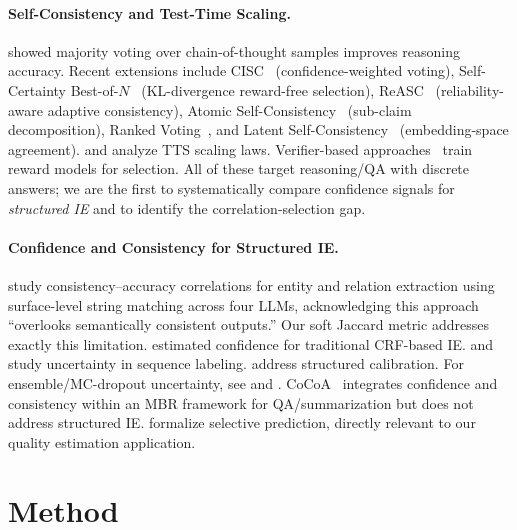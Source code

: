 \documentclass[11pt,a4paper]{article}
\begin{document}
\paragraph{Self-Consistency and Test-Time Scaling.}
\citet{wang2023selfconsistency} showed majority voting over chain-of-thought samples improves reasoning accuracy.
Recent extensions include CISC~\cite{huang2025cisc} (confidence-weighted voting), Self-Certainty Best-of-$N$~\cite{zhang2026selfcertainty} (KL-divergence reward-free selection), ReASC~\cite{li2026reasc} (reliability-aware adaptive consistency), Atomic Self-Consistency~\cite{chen2024atomic} (sub-claim decomposition), Ranked Voting~\cite{liu2025rankedvoting}, and Latent Self-Consistency~\cite{wu2025latentsc} (embedding-space agreement).
\citet{snell2024scaling} and \citet{brown2024large} analyze TTS scaling laws.
Verifier-based approaches~\cite{cobbe2021verifier,lightman2023stepwise} train reward models for selection.
All of these target reasoning/QA with discrete answers; we are the first to systematically compare confidence signals for \emph{structured IE} and to identify the correlation-selection gap.

\paragraph{Confidence and Consistency for Structured IE.}
\citet{nédellec2026consistency} study consistency--accuracy correlations for entity and relation extraction using surface-level string matching across four LLMs, acknowledging this approach ``overlooks semantically consistent outputs.''
Our soft Jaccard metric addresses exactly this limitation.
\citet{culotta2004confidence} estimated confidence for traditional CRF-based IE.
\citet{xiao2019uncertainty} and \citet{shelmanov2021uncertainty} study uncertainty in sequence labeling.
\citet{jagannatha2022calibration} address structured calibration.
For ensemble/MC-dropout uncertainty, see \citet{lakshminarayanan2017simple} and \citet{gal2016dropout}.
CoCoA~\cite{vashurin2025cocoa} integrates confidence and consistency within an MBR framework for QA/summarization but does not address structured IE.
\citet{geifman2017selective} formalize selective prediction, directly relevant to our quality estimation application.

\section{Method}
\label{sec:method}
\end{document}
